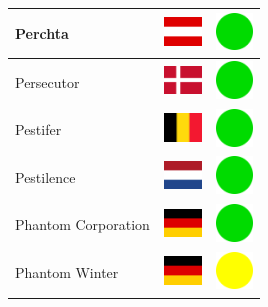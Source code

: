 \documentclass[12pt, a4paper, twoside]{report}
\begin{document}
\begin{center}
\begin{longtable}{|p{5cm}|p{2cm}|p{2cm}|}
 Perchta                                                    & \includegraphics[width=1cm]{../4x3/at} &   \includegraphics[width=1cm]{../likes/y} \\ \hline
 Persecutor                                                 & \includegraphics[width=1cm]{../4x3/dk} &   \includegraphics[width=1cm]{../likes/y} \\ \hline
 Pestifer                                                   & \includegraphics[width=1cm]{../4x3/be} &   \includegraphics[width=1cm]{../likes/y} \\ \hline
 Pestilence                                                 & \includegraphics[width=1cm]{../4x3/nl} &   \includegraphics[width=1cm]{../likes/y} \\ \hline
 Phantom Corporation                                        & \includegraphics[width=1cm]{../4x3/de} &   \includegraphics[width=1cm]{../likes/y} \\ \hline
 Phantom Winter                                             & \includegraphics[width=1cm]{../4x3/de} &   \includegraphics[width=1cm]{../likes/m} \\ \hline

\end{longtable}
\end{center}
\end{document}

